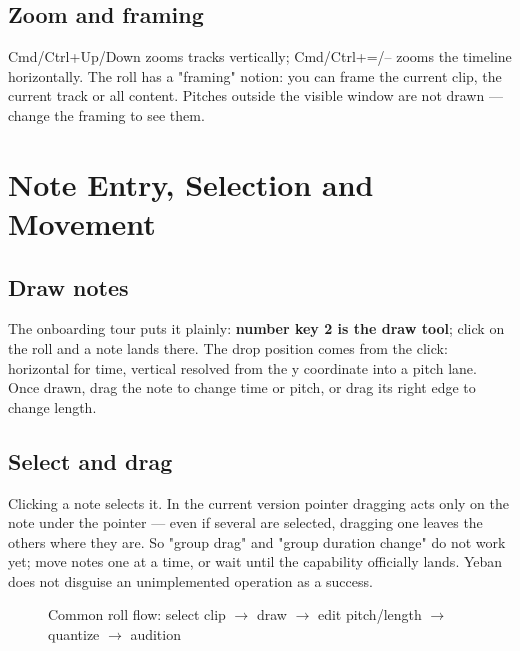 \subsection{Zoom and framing}

Cmd/Ctrl+Up/Down zooms tracks vertically; Cmd/Ctrl+=/-- zooms the timeline
horizontally. The roll has a "framing" notion: you can frame the current clip, the
current track or all content. Pitches outside the visible window are not drawn —
change the framing to see them.

\section{Note Entry, Selection and Movement}

\subsection{Draw notes}

The onboarding tour puts it plainly: \textbf{number key 2 is the draw tool}; click on
the roll and a note lands there. The drop position comes from the click: horizontal
for time, vertical resolved from the y coordinate into a pitch lane. Once drawn, drag
the note to change time or pitch, or drag its right edge to change length.

\subsection{Select and drag}

Clicking a note selects it. In the current version pointer dragging acts only on the
note under the pointer — even if several are selected, dragging one leaves the others
where they are. So "group drag" and "group duration change" do not work yet; move
notes one at a time, or wait until the capability officially lands. Yeban does not
disguise an unimplemented operation as a success.

\begin{figure}[htbp]
\centering
{}
\caption{Common roll flow: select clip $\to$ draw $\to$ edit pitch/length $\to$ quantize $\to$ audition}
\label{fig:ch04-roll-flow}
\end{figure}

